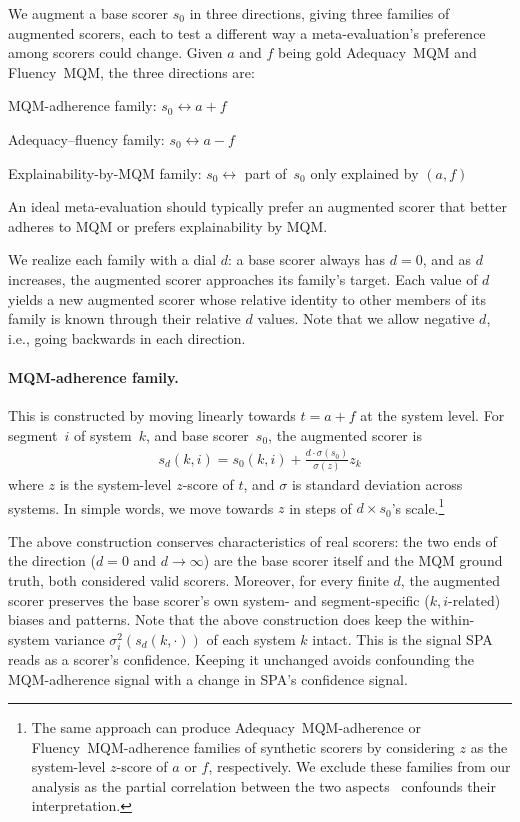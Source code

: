 \documentclass[11pt]{article}
\begin{document}
We augment a base scorer $s_0$ in three directions, giving three
families of augmented scorers, each to test a different way a
meta-evaluation's preference among scorers could change. Given $a$ and $f$ being gold Adequacy~MQM and Fluency~MQM, the three directions are:
\begin{compactitem}
  \item MQM-adherence family: $s_0 \leftrightarrow a+f$
  \item Adequacy--fluency family: $s_0 \leftrightarrow a-f$
  \item Explainability-by-MQM family: $s_0 \leftrightarrow$ part of~$s_0$ only explained by $(a,f)$
\end{compactitem}
An ideal meta-evaluation should typically prefer an augmented scorer that better adheres to MQM or prefers explainability by MQM.

We realize each family with a dial $d$: a base scorer always has $d=0$,
and as $d$ increases, the augmented scorer approaches its family's
target. Each value of $d$ yields a new augmented scorer whose relative
identity to other members of its family is known through their relative
$d$ values. Note that we allow negative $d$, i.e., going backwards in each
direction.

\paragraph{MQM-adherence family.} This is constructed by moving linearly towards $t=a+f$ at the system level. For
segment~$i$ of system~$k$, and base scorer~$s_0$, the augmented scorer is
\begin{align}
  s_{d}(k, i) = s_0(k, i) + \frac{d \cdot \sigma(s_0)}{\sigma(z)} z_k
\end{align}
where $z$ is the system-level $z$-score of $t$, and $\sigma$ is standard deviation across systems. In simple words, we move towards $z$ in
steps of $d \times s_0$'s scale.\footnote{The same approach can produce Adequacy~MQM-adherence or Fluency~MQM-adherence families of synthetic scorers by considering $z$ as the system-level $z$-score of $a$ or $f$, respectively. We exclude these families from our analysis as the partial correlation between the two aspects~\citep{shayegh-etal-2025-feeding} confounds their interpretation.}

The above construction conserves characteristics of real scorers: the two
ends of the direction ($d=0$ and $d\rightarrow\infty$) are the base scorer
itself and the MQM ground truth, both considered valid
scorers. Moreover, for every finite $d$, the augmented scorer preserves
the base scorer's own system- and segment-specific ($k,i$-related) biases
and patterns. Note that the above construction does keep the
within-system variance $\sigma_i^2(s_d(k,\cdot))$ of each system $k$
intact. This is the signal SPA reads as a scorer's confidence. Keeping it
unchanged avoids confounding the MQM-adherence signal with a change in SPA's confidence signal.
\end{document}
